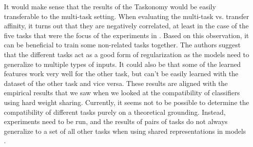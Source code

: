 It would make sense that the results of the Taskonomy would be easily transferable to the multi-task setting. 
When evaluating the multi-task vs. transfer affinity, it turns out that they are negatively correlated, at least in the case of the five tasks that were the focus of the experiments in \citep{whichTasks}. 
Based on this observation, it can be beneficial to train some non-related tasks together. 
The authors suggest that the different tasks act as a good form of regularization as the models need to generalize to multiple types of inputs. 
It could also be that some of the learned features work very well for the other task, but can't be easily learned with the dataset of the other task and vice versa.
These results are aligned with the empirical results that we saw when we looked at the compatibility of classifiers using hard weight sharing.
Currently, it seems not to be possible to determine the compatibility of different tasks purely on a theoretical grounding.
Instead, experiments need to be run, and the results of pairs of tasks do not always generalize to a set of all other tasks when using shared representations in models \citep{visualPerson}.
